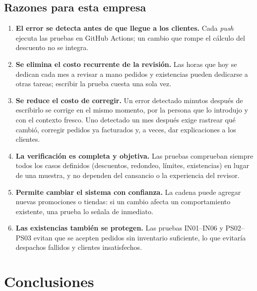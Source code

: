 \documentclass[11pt,a4paper]{article}
\begin{document}
\subsection{Razones para esta empresa}

\begin{enumerate}
  \item \textbf{El error se detecta antes de que llegue a los clientes.} Cada \emph{push} ejecuta las
        pruebas en GitHub Actions; un cambio que rompe el cálculo del descuento no se integra.
  \item \textbf{Se elimina el costo recurrente de la revisión.} Las horas que hoy se dedican cada mes
        a revisar a mano pedidos y existencias pueden dedicarse a otras tareas; escribir la prueba
        cuesta una sola vez.
  \item \textbf{Se reduce el costo de corregir.} Un error detectado minutos después de escribirlo se
        corrige en el mismo momento, por la persona que lo introdujo y con el contexto fresco. Uno
        detectado un mes después exige rastrear qué cambió, corregir pedidos ya facturados y, a veces,
        dar explicaciones a los clientes.
  \item \textbf{La verificación es completa y objetiva.} Las pruebas comprueban siempre todos los
        casos definidos (descuentos, redondeo, límites, existencias) en lugar de una muestra, y no
        dependen del cansancio o la experiencia del revisor.
  \item \textbf{Permite cambiar el sistema con confianza.} La cadena puede agregar nuevas promociones
        o tiendas: si un cambio afecta un comportamiento existente, una prueba lo señala de inmediato.
  \item \textbf{Las existencias también se protegen.} Las pruebas IN01--IN06 y PS02--PS03 evitan que
        se acepten pedidos sin inventario suficiente, lo que evitaría despachos fallidos y clientes
        insatisfechos.
\end{enumerate}

\section{Conclusiones}
\end{document}
